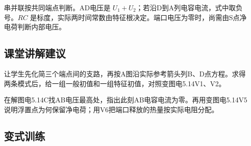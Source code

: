 \documentclass[UTF8,fontset=fandol,a4paper,11pt]{ctexart}
\begin{document}
串并联按共同端点判断。AD电压是 $U_1+U_2$；若沿D到A列电容电流，式中取负号。$RC$ 是标度，实际两时间常数由特征根决定。端口电压为零时，尚需由S点净电荷判断内部电压。



\subsection*{课堂讲解建议}

让学生先化简三个端点间的支路，再按A图沿实际参考箭头列B、D点方程。求得两条模式后，给一组一般初值和一组特征初值，对照变图电5.14V1、V2。

在解图电5.14C找AB电压最高处，指出此刻AB电容电流为零。再用变图电5.14V5说明浮置点为何保留净电荷；用V6把端口释放的热量按实际电阻分配。


\subsection*{变式训练}
\end{document}
